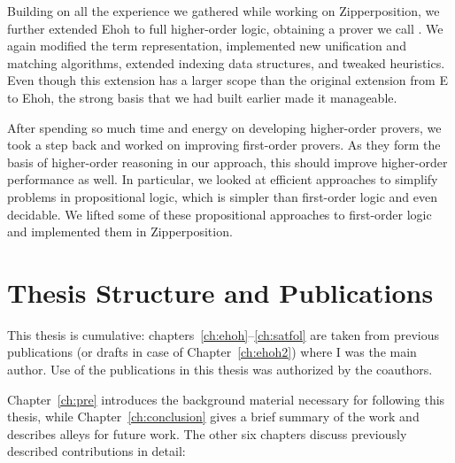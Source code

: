   Building on all the experience we gathered while working on Zipperposition,
  we further extended Ehoh to full higher-order logic, obtaining a prover we call
  \newehoh{}. We again modified the term representation, implemented new unification and
  matching algorithms, extended indexing data structures, and tweaked
  heuristics. Even though this extension has a larger scope than the original
  extension from E to Ehoh, the strong basis that we had built earlier made it
  manageable.
  \pagebreak[2]

  
  After spending so much time and energy on developing higher-order provers, we
  took a step back and worked on improving first-order provers. As they form the
  basis of higher-order reasoning in our approach, this should improve
  higher-order performance as well. In particular, we looked at efficient
  approaches to simplify problems in propositional logic, which is simpler than
  first-order logic and even decidable. We lifted some of these propositional
  approaches to first-order logic and implemented them in Zipperposition. 

\section{Thesis Structure and Publications}

This thesis is cumulative: chapters~\ref{ch:ehoh}--\ref{ch:satfol}  are
taken from previous publications (or drafts in case of
Chapter~\ref{ch:ehoh2}) where I was the main author. Use
of the publications in this thesis was authorized by the coauthors. 

Chapter~\ref{ch:pre} introduces the background material necessary for following this thesis,
while Chapter~\ref{ch:conclusion} gives a brief summary of the work and describes alleys for future work.
The other six chapters discuss previously described contributions in detail:

